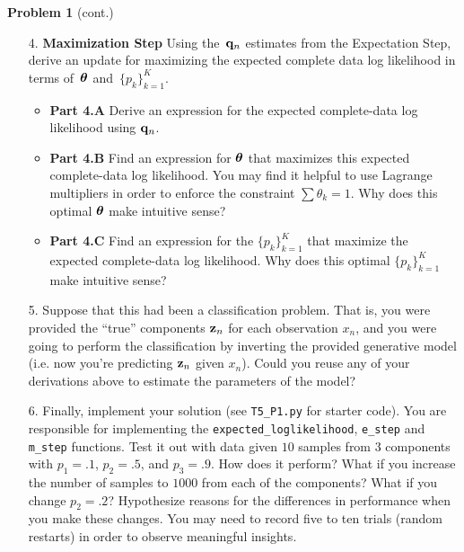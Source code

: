 \documentclass[submit]{harvardml}
\begin{document}
\begin{framed}
\noindent\textbf{Problem 1} (cont.)\\
\begin{enumerate}

  
\item[4.] \textbf{Maximization Step}
Using the~$\mathbf{q}_n$ estimates from the Expectation Step, derive an update for maximizing the expected complete data log likelihood in terms of~$\boldsymbol{\theta}$ and~$\{ p_k \}^K_{k=1}$.

\begin{itemize}
    \item \textbf{Part 4.A } Derive an expression for the expected complete-data log likelihood using $\mathbf{q}_n$.
    \item \textbf{Part 4.B } Find an expression for $\boldsymbol{\theta}$ that maximizes this expected complete-data log likelihood. You may find it helpful to use Lagrange multipliers in order to enforce the constraint $\sum \theta_k = 1$. Why does this optimal $\boldsymbol{\theta}$ make intuitive sense?
    \item \textbf{Part 4.C } Find an expression for the $\{p_k \}^K_{k = 1}$ that maximize the expected
      complete-data log likelihood.  Why does this optimal $\{p_k \}^K_{k = 1}$  make intuitive sense?
    \end{itemize}
    
\item[5.] Suppose that this had been a classification problem. That is,
  you were provided the ``true'' components $\mathbf{z}_n$ for each
  observation $x_n$,
  and you were going to perform the classification by
  inverting the provided generative model (i.e. now you're predicting $\mathbf{z}_n$ given $x_n$). Could you reuse any of
  your derivations above to estimate the parameters of the model?
  

\item[6.] Finally, implement your solution (see \texttt{T5\_P1.py} for starter code).  You are responsible for implementing the \texttt{expected\_loglikelihood}, \texttt{e\_step} and \texttt{m\_step} functions. Test it out with data given
  $10$ samples from $3$ components with $p_1 = .1$, $p_2=.5$, and
  $p_3=.9$.  How does it perform?  What if you increase the number of
  samples to $1000$ from each of the components?  What if you change
  $p_2=.2$?  Hypothesize reasons for the differences in performance
  when you make these changes. You may need to record five to ten trials (random restarts) in order to observe meaningful insights.
\end{enumerate}
  
\end{framed}  
\end{document}
